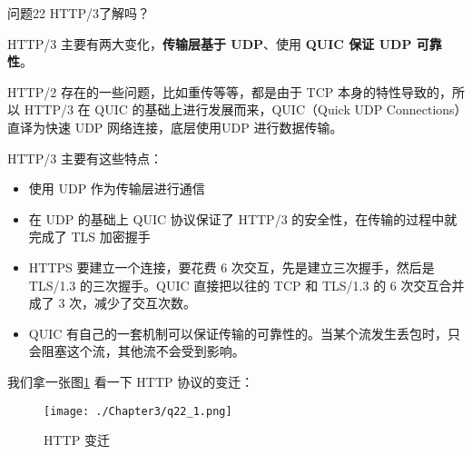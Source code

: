 \documentclass[cn,11pt,color=blue,lang=cn]{elegantbook}
\begin{document}
\begin{custom}{问题22}
HTTP/3了解吗？
\end{custom}
\begin{solution}

HTTP/3 主要有两大变化，\textbf{传输层基于 UDP}、使用 \textbf{QUIC 保证 UDP 可靠性}。

HTTP/2 存在的一些问题，比如重传等等，都是由于 TCP 本身的特性导致的，所以 HTTP/3 在 QUIC 的基础上进行发展而来，QUIC（Quick UDP Connections）直译为快速 UDP 网络连接，底层使用UDP 进行数据传输。

HTTP/3 主要有这些特点：

\begin{itemize}
	\item 使用 UDP 作为传输层进行通信
	\item 在 UDP 的基础上 QUIC 协议保证了 HTTP/3 的安全性，在传输的过程中就完成了 TLS 加密握手
	\item HTTPS 要建⽴⼀个连接，要花费 6 次交互，先是建⽴三次握⼿，然后是 TLS/1.3 的三次握⼿。QUIC 直接把以往的 TCP 和 TLS/1.3 的 6 次交互合并成了 3 次，减少了交互次数。
	\item QUIC 有⾃⼰的⼀套机制可以保证传输的可靠性的。当某个流发⽣丢包时，只会阻塞这个流，其他流不会受到影响。
\end{itemize}

我们拿一张图\ref{fig22_1} 看一下 HTTP 协议的变迁：
\begin{figure}[htbp]
\centering
\texttt{[image: ./Chapter3/q22\_1.png]}
\caption{HTTP 变迁}
\label{fig22_1}
\end{figure}
\end{solution}
\end{document}
